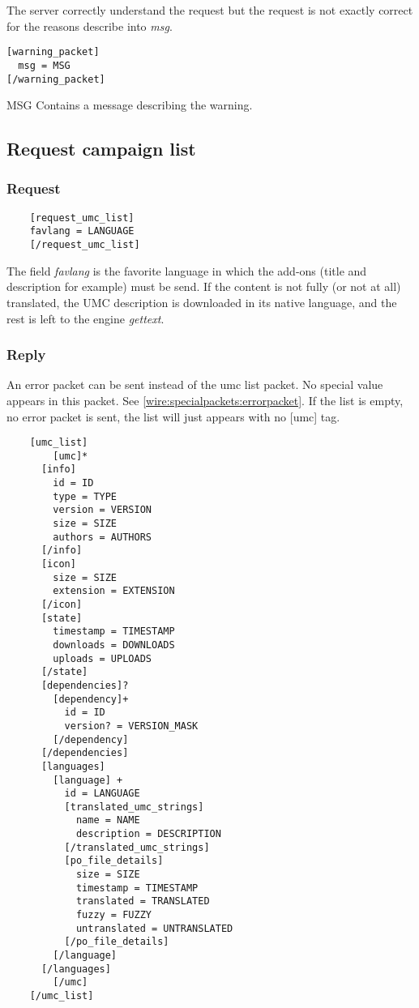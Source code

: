 The server correctly understand the request but the request is not exactly correct for the reasons describe into \textit{msg}.
\begin{lstlisting}
[warning_packet]
  msg = MSG
[/warning_packet]
\end{lstlisting}

\begin{description}
 \item MSG Contains a message describing the warning.
\end{description}

\subsection{Request campaign list}
\label{wire:request_campaign_list}

\subsubsection{Request}
\begin{lstlisting}
	[request_umc_list]
    favlang = LANGUAGE
	[/request_umc_list]
\end{lstlisting}

The field \textit{favlang} is the favorite language in which the add-ons (title and description for example) must be send. 
If the content is not fully (or not at all) translated,  the UMC description is downloaded in its native language, 
and the rest is left to the engine \textit{gettext}.
\newline
\subsubsection{Reply}

An error packet can be sent instead of the umc list packet. No special value appears in this packet. See \cref{wire:specialpackets:errorpacket}.
If the list is empty, no error packet is sent, the list will just appears with no [umc] tag.

\begin{lstlisting}
	[umc_list]
		[umc]*
      [info]
        id = ID
        type = TYPE
        version = VERSION
        size = SIZE
        authors = AUTHORS
      [/info]
      [icon]
        size = SIZE
        extension = EXTENSION
      [/icon]
      [state]
        timestamp = TIMESTAMP
        downloads = DOWNLOADS
        uploads = UPLOADS
      [/state]
      [dependencies]?
        [dependency]+
          id = ID
          version? = VERSION_MASK
        [/dependency]
      [/dependencies]
      [languages]
        [language] +
          id = LANGUAGE
          [translated_umc_strings]
            name = NAME
            description = DESCRIPTION
          [/translated_umc_strings]
          [po_file_details]
            size = SIZE
            timestamp = TIMESTAMP
            translated = TRANSLATED
            fuzzy = FUZZY
            untranslated = UNTRANSLATED
          [/po_file_details]
        [/language]
      [/languages]
		[/umc]
	[/umc_list]
\end{lstlisting}

